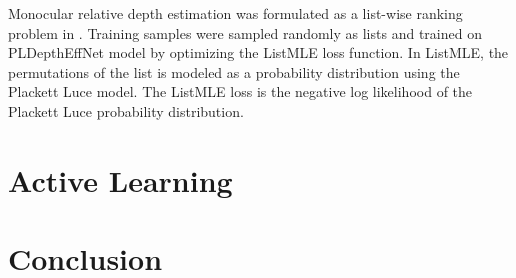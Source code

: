 Monocular relative depth estimation was formulated as a list-wise ranking problem in \cite{Lienen_2021_CVPR}. Training samples were sampled randomly as lists and trained on PLDepthEffNet model \cite{Lienen_2021_CVPR} by optimizing the ListMLE loss function\cite{xia2008listwise}. In ListMLE, the permutations of the list is modeled as a probability distribution using the Plackett Luce model. The ListMLE loss is the negative log likelihood of the Plackett Luce probability distribution.

\section{Active Learning}
\label{sec:related:sec4}


\section{Conclusion}
\label{sec:related:conclusion}


